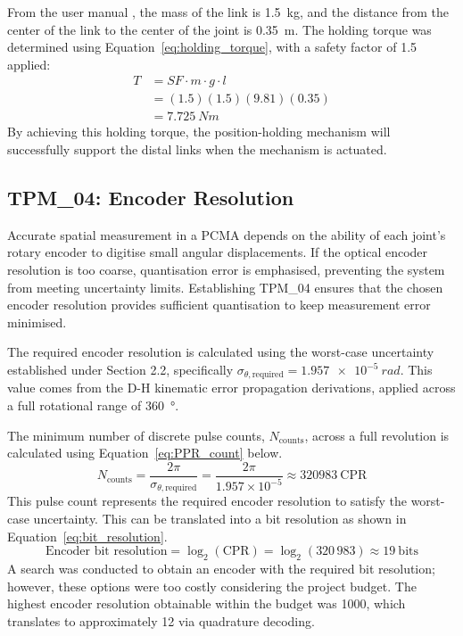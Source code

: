 From the user manual \citep{Faro:2024}, the mass of the link is \SI{1.5}{kg}, and the distance from the center of the link to the center of the joint is \SI{0.35}{m}. The holding torque was determined using Equation~\ref{eq:holding_torque}, with a safety factor of 1.5 applied:
\begin{equation}\label{eq:holding_torque}
	\begin{aligned}
		T &= SF \cdot m \cdot g \cdot l \\
		&= (1.5)(1.5)(9.81)(0.35) \\
		&= \SI{7.725}{Nm}
	\end{aligned}
\end{equation}
By achieving this holding torque, the position-holding mechanism will successfully support the distal links when the mechanism is actuated.

\subsection{TPM\_04: Encoder Resolution}

Accurate spatial measurement in a PCMA depends on the ability of each joint's rotary encoder to digitise small angular displacements. If the optical encoder resolution is too coarse, quantisation error is emphasised, preventing the system from meeting uncertainty limits. Establishing TPM\_04 ensures that the chosen encoder resolution provides sufficient quantisation to keep measurement error minimised.

The required encoder resolution is calculated using the worst-case uncertainty established under Section 2.2, specifically $\sigma_{\theta,\text{required}} = \SI{1.957e-5}{rad}$. This value comes from the D-H kinematic error propagation derivations, applied across a full rotational range of \SI{360}{\degree}.

The minimum number of discrete pulse counts, $N_{\text{counts}}$, across a full revolution is calculated using Equation~\ref{eq:PPR_count} below.
\begin{equation}\label{eq:PPR_count}
	N_{\text{counts}} = \frac{2\pi}{\sigma_{\theta,\text{required}}} = \frac{2\pi}{1.957 \times 10^{-5}} \approx \SI{320983}{\text{CPR}}
\end{equation}
This pulse count represents the required encoder resolution to satisfy the worst-case uncertainty. This can be translated into a bit resolution as shown in Equation~\ref{eq:bit_resolution}.
\begin{equation}\label{eq:bit_resolution}
	\text{Encoder bit resolution} = \log_2(\text{CPR}) = \log_2(320\,983) \approx \SI{19}{\text{bits}}
\end{equation}
A search was conducted to obtain an encoder with the required bit resolution; however, these options were too costly considering the project budget. The highest encoder resolution obtainable within the budget was \SI{1000}{}, which translates to approximately \SI{12}{} via quadrature decoding.

